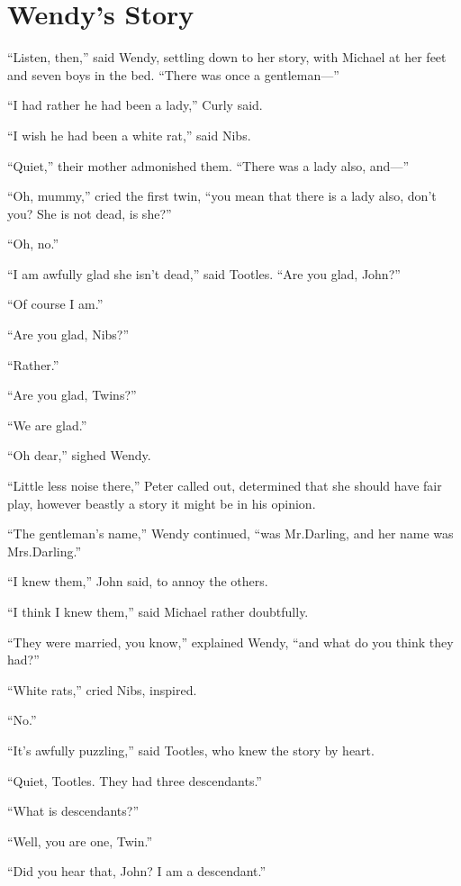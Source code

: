 
\chapter{Wendy’s Story}

“Listen, then,” said Wendy, settling down to her story,
with Michael at her feet and seven boys in the bed.
“There was once a gentleman—”

“I had rather he had been a lady,” Curly said.

“I wish he had been a white rat,” said Nibs.

“Quiet,” their mother admonished them.
“There was a lady also, and—”

“Oh, mummy,” cried the first twin,
“you mean that there is a lady also, don’t you?
She is not dead, is she?”

“Oh, no.”

“I am awfully glad she isn’t dead,” said Tootles.
“Are you glad, John?”

“Of course I am.”

“Are you glad, Nibs?”

“Rather.”

“Are you glad, Twins?”

“We are glad.”

“Oh dear,” sighed Wendy.

“Little less noise there,” Peter called out,
determined that she should have fair play,
however beastly a story it might be in his opinion.

“The gentleman’s name,” Wendy continued, “was Mr.\@ Darling, and her name was Mrs.\@ Darling.”

“I knew them,” John said, to annoy the others.

“I think I knew them,” said Michael rather doubtfully.

“They were married, you know,” explained Wendy,
“and what do you think they had?”

“White rats,” cried Nibs, inspired.

“No.”

“It’s awfully puzzling,” said Tootles,
who knew the story by heart.

“Quiet, Tootles.
They had three descendants.”

“What is descendants?”

“Well, you are one, Twin.”

“Did you hear that, John?
I am a descendant.”

